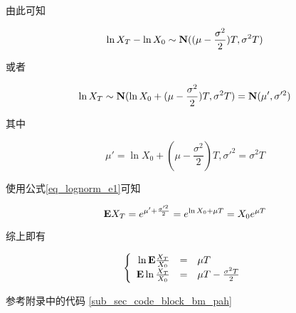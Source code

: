 由此可知

\begin{equation}
    \ln X_T - \ln X_0 \sim \mathbf{N}((\mu - \frac{\sigma^2}{2})T, \sigma^2T)
\end{equation}

或者

\begin{equation}
    \ln X_T  \sim \mathbf{N}(\ln X_0 + (\mu - \frac{\sigma^2}{2})T, \sigma^2T) = \mathbf{N}(\mu', \sigma'^2)
\end{equation}

其中

\begin{equation}
    \mu' = \ln X_0 + (\mu - \frac{\sigma^2}{2})T, \sigma'^2 = \sigma^2T
\end{equation}

使用公式\ref{eq_lognorm_e1}可知

\begin{equation}
    \mathbf{E} X_T = e^{\mu' + \frac{\sigma'^2}{2}} = e^{\ln X_0 + \mu T} = X_0e^{\mu T}
\end{equation}

综上即有

\begin{equation}
    \left\{
    \begin{array}{rcl}
        \ln \mathbf{E} \frac{X_T}{X_0} & = & \mu T                       \\
        \mathbf{E} \ln \frac{X_T}{X_0} & = & \mu T - \frac{\sigma^2T}{2}
    \end{array}
    \right.
\end{equation}

参考附录中的代码 \ref{sub_sec_code_block_bm_pah}